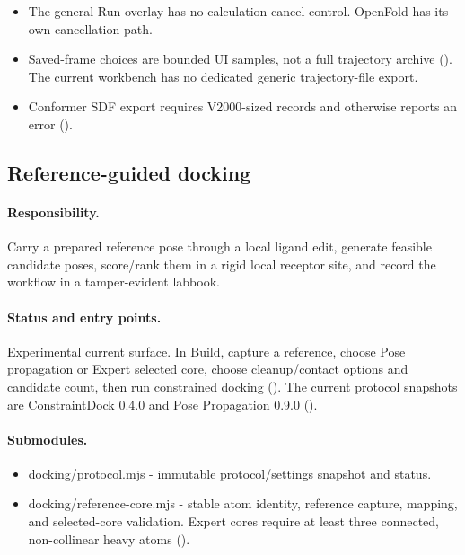\documentclass[11pt]{article}
\begin{document}
\begin{small}
\begin{itemize}[leftmargin=*]
\item The general Run overlay has no calculation-cancel control. OpenFold has its own cancellation path.

\item Saved-frame choices are bounded UI samples, not a full trajectory archive (). The current workbench has no dedicated generic trajectory-file export.

\item Conformer SDF export requires V2000-sized records and otherwise reports an error ().

\end{itemize}

\subsection{Reference-guided docking}\label{appB:sec17}

\paragraph{Responsibility.}

Carry a prepared reference pose through a local ligand edit, generate feasible candidate poses, score/rank them in a rigid local receptor site, and record the workflow in a tamper-evident labbook.

\paragraph{Status and entry points.}

Experimental current surface. In Build, capture a reference, choose Pose propagation or Expert selected core, choose cleanup/contact options and candidate count, then run constrained docking (). The current protocol snapshots are ConstraintDock 0.4.0 and Pose Propagation 0.9.0 ().

\paragraph{Submodules.}

\begin{itemize}[leftmargin=*]

\item docking/protocol.mjs - immutable protocol/settings snapshot and status.

\item docking/reference-core.mjs - stable atom identity, reference capture, mapping, and selected-core validation. Expert cores require at least three connected, non-collinear heavy atoms ().


\end{itemize}
\end{small}
\end{document}
